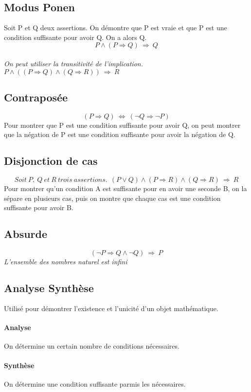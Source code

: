 \subsection{Modus Ponen}
Soit P et Q deux assertions. On démontre que P est vraie et que P est une condition suffisante pour avoir Q. On a alors Q.
\\$$P\wedge (P\Rightarrow Q)~\Rightarrow ~Q$$
\\\textsl{On peut utiliser la transitivité de l'implication. $P\wedge ((P\Rightarrow Q)\wedge (Q\Rightarrow R))~\Rightarrow ~R$}

\subsection{Contraposée}
$$(P\Rightarrow Q)~\Longleftrightarrow ~(\neg Q\Rightarrow\neg P)$$
Pour montrer que P est une condition suffisante pour avoir Q, on peut montrer que la négation de P est une condition suffisante pour avoir la négation de Q.

\subsection{Disjonction de cas}
$$Soit~P,~Q~et~R~trois~assertions.~~(P\vee Q)\wedge (P\Rightarrow R)\wedge (Q\Rightarrow R)~\Rightarrow ~R$$
Pour montrer qu'un condition A est suffisante pour en avoir une seconde B, on la sépare en plusieurs cas, puis on montre que chaque cas est une condition suffisante pour avoir B.

\subsection{Absurde}
$$(\neg P\Rightarrow Q\wedge\neg Q)~\Rightarrow ~P$$
\textsl{L'ensemble des nombres naturel est infini}

\subsection{Analyse Synthèse}
Utilisé pour démontrer l'existence et l'unicité d'un objet mathématique.
\paragraph{Analyse}
On détermine un certain nombre de conditions nécessaires.
\paragraph{Synthèse}
On détermine une condition suffisante parmis les nécessaires.


